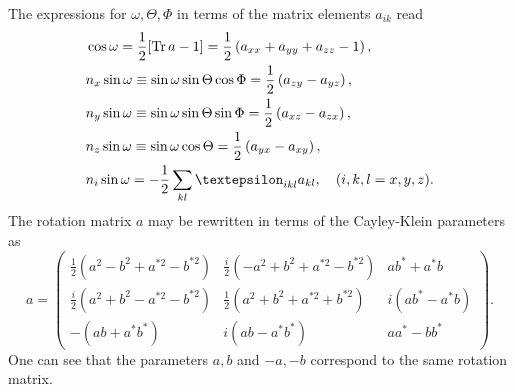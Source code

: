 The expressions for \(\omega, \Theta, \Phi\) in terms of the matrix elements \(a_{i k}\) read
\begin{align}
& \cos \omega=\frac{1}{2}[\Tr  a-1]= \frac{1}{2}\left(a_{x x}+a_{y y}+a_{z z}-1\right) , \notag\\
& n_{x} \sin \omega \equiv \sin \omega \sin \Theta \cos \Phi= \frac{1}{2}\left(a_{z y}-a_{y z}\right) , \notag\\
& n_{y} \sin \omega \equiv \sin \omega \sin \Theta \sin \Phi= \frac{1}{2}\left(a_{x z}-a_{z x}\right) , \label{eq:1:4:58}\\
& n_{z} \sin \omega \equiv \sin \omega \cos \Theta= \frac{1}{2}\left(a_{y x}-a_{x y}\right)  ,\notag\\
& n_{i} \sin \omega=-\frac{1}{2} \sum_{k l} \varepsilon_{i k l} a_{k l}, \quad(i, k, l=x, y, z) .\notag
\end{align}
The rotation matrix \(a\) may be rewritten in terms of the Cayley-Klein parameters as
\begin{equation}
a=\begin{pmatrix}
\frac{1}{2}\left(a^{2}-b^{2}+a^{* 2}-b^{* 2}\right) & \frac{i}{2}\left(-a^{2}+b^{2}+a^{* 2}-b^{* 2}\right) & a b^{*}+a^{*} b  \label{eq:1:4:59}\\
\frac{i}{2}\left(a^{2}+b^{2}-a^{* 2}-b^{* 2}\right) & \frac{1}{2}\left(a^{2}+b^{2}+a^{* 2}+b^{* 2}\right) & i\left(a b^{*}-a^{*} b\right) \\
-\left(a b+a^{*} b^{*}\right) & i\left(a b-a^{*} b^{*}\right) & a a^{*}-b b^{*}
\end{pmatrix} .
\end{equation}
One can see that the parameters \(a, b\) and \(-a,-b\) correspond to the same rotation matrix.

